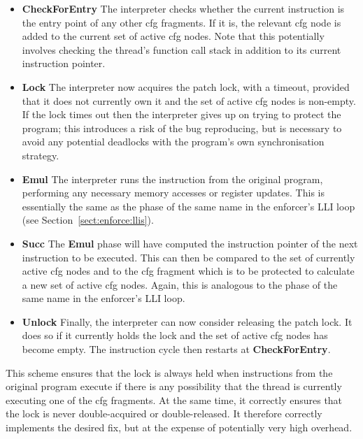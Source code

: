 \begin{itemize}
\item \textbf{CheckForEntry} The interpreter checks whether the
  current instruction is the entry point of any other \gls{cfg} fragments.
  If it is, the relevant \gls{cfg} node is added to the current set of
  active \gls{cfg} nodes.  Note that this potentially involves checking the
  thread's function call stack in addition to its current instruction
  pointer.

\item \textbf{Lock} The interpreter now acquires the patch lock, with
  a timeout, provided that it does not currently own it and the set of
  active \gls{cfg} nodes is non-empty.  If the lock times out then the
  interpreter gives up on trying to protect the program; this
  introduces a risk of the bug reproducing, but is necessary to avoid
  any potential deadlocks with the program's own synchronisation
  strategy.

\item \textbf{Emul} The interpreter runs the instruction from the
  original program, performing any necessary memory accesses or
  register updates.  This is essentially the same as the phase of the
  same name in the enforcer's LLI loop (see
  Section~\ref{sect:enforce:llis}).

\item \textbf{Succ} The \textbf{Emul} phase will have computed the
  instruction pointer of the next instruction to be executed.  This
  can then be compared to the set of currently active \gls{cfg} nodes and to
  the \gls{cfg} fragment which is to be protected to calculate a new set of
  active \gls{cfg} nodes.  Again, this is analogous to the phase of the same
  name in the enforcer's LLI loop.

\item \textbf{Unlock} Finally, the interpreter can now consider
  releasing the patch lock.  It does so if it currently holds the lock
  and the set of active \gls{cfg} nodes has become empty.  The instruction
  cycle then restarts at \textbf{CheckForEntry}.
\end{itemize}

This scheme ensures that the lock is always held when instructions
from the original program execute if there is any possibility that the
thread is currently executing one of the \gls{cfg} fragments.  At the same
time, it correctly ensures that the lock is never double-acquired or
double-released.  It therefore correctly implements the desired fix,
but at the expense of potentially very high overhead.

